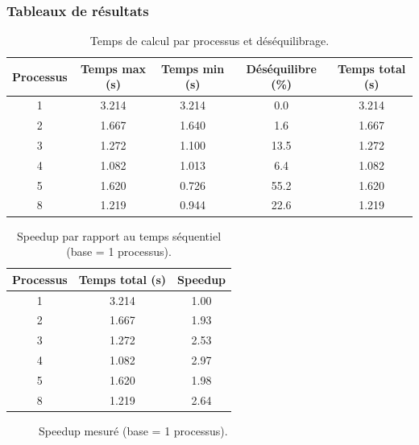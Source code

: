 \documentclass[a4paper,13pt]{book}
\begin{document}
\subsubsection{Tableaux de résultats}

\begin{table}[ht]
  \centering
  \caption{Temps de calcul par processus et déséquilibrage.}
  \label{tab:temps}
  \begin{tabular}{@{}ccccc@{}}
    \toprule
    \textbf{Processus} & \textbf{Temps max (s)} & \textbf{Temps min (s)} & \textbf{Déséquilibre (\%)} & \textbf{Temps total (s)} \\
    \midrule
    1 & 3.214 & 3.214 & 0.0 & 3.214 \\
    \hline
    2 & 1.667 & 1.640 & 1.6 & 1.667 \\
    \hline
    3 & 1.272 & 1.100 & 13.5 & 1.272 \\
    \hline
    4 & 1.082 & 1.013 & 6.4 & 1.082 \\
    \hline
    5 & 1.620 & 0.726 & 55.2 & 1.620 \\
    \hline
    8 & 1.219 & 0.944 & 22.6 & 1.219 \\
    \bottomrule
  \end{tabular}
\end{table}
\begin{table}[ht]
  \centering
  \caption{Speedup par rapport au temps séquentiel (base = 1 processus).}
  \label{tab:speedup}
  \begin{tabular}{@{}ccc@{}}
    \toprule
    \textbf{Processus} & \textbf{Temps total (s)} & \textbf{Speedup} \\
    \midrule
    1 & 3.214 & 1.00 \\
    2 & 1.667 & 1.93 \\
    3 & 1.272 & 2.53 \\
    4 & 1.082 & 2.97 \\
    5 & 1.620 & 1.98 \\
    8 & 1.219 & 2.64 \\
    \bottomrule
  \end{tabular}
\end{table}
\begin{figure}[ht]
  \centering
  \caption{Speedup mesuré  (base = 1 processus).}
  \label{fig:speedup}
\end{figure}
\end{document}

